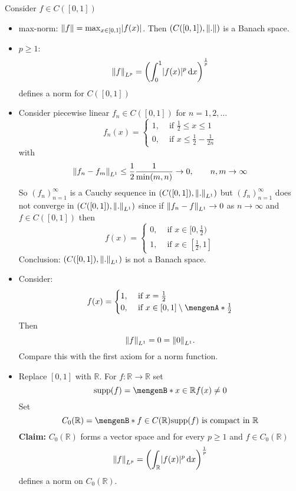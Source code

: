 Consider $ f \in C([0,1])$
\begin{itemize}
	\item max-norm: $\norm{f} = \max_{x \in [0,1]}\abs{f(x)}$. Then $(C([0,1]),\norm{.})$ is a Banach space.
	\item $p \geq 1:$
	\[
		\norm{f}_{L^p} = \left( \int_{0}^{1}\abs{f(x)}^p \,\mathrm{d}x \right)^{\frac{1}{p}} 
	\]
	defines a norm for $C([0,1])$
\end{itemize}
\begin{bemerkung}
	\begin{itemize}
		\item Consider piecewise linear $f_n \in C([0,1])$ for $n =1,2, \dots$
		\[
			f_n(x) = \begin{cases}
				1, &\text{ if } \frac{1}{2} \leq x \leq 1 \\
				0, &\text{ if } x \leq \frac{1}{2} - \frac{1}{2n}
			\end{cases}
		\]
		with
		\[
			\norm{f_n-f_m}_{L^1} \leq \frac{1}{2} \frac{1}{\min(m,n)} \to 0, \qquad n,m \to \infty
		\]
		So $(f_n)_{n=1}^{\infty}$ is a Cauchy sequence in $(C([0,1]),\norm{.}_{L^1})$ but $(f_n)_{n=1}^{\infty}$ does not converge in $(C([0,1]),\norm{.}_{L^1})$ since
		if $\norm{f_n - f}_{L^1} \to 0$ as $n \to \infty$ and $f \in C([0,1])$ then
		\[
			f(x) = \begin{cases}
				0, &\text{ if }x \in [0,\frac{1}{2})\\
				1, &\text{ if }x \in [\frac{1}{2},1]
			\end{cases}
		\]
		Conclusion: $(C([0,1]), \norm{.}_{L^1})$ is not a Banach space.
		\item Consider:
		\[
			f(x) = \begin{cases}
				1, &\text{ if }x = \frac{1}{2}\\
				0, &\text{ if }x \in [0,1] \setminus \set{\frac{1}{2}}
			\end{cases}
		\]
		Then
		\[
			\norm{f}_{L^1} = 0 = \norm{0}_{L^1}.
		\]
		Compare this with the first axiom for a norm function.
		\item Replace $[0,1]$ with $\mathbb{R}$. For $f : \mathbb{R} \to \mathbb{R}$ set \[
			\supp(f) = \set[x \in \mathbb{R}]{f(x) \neq 0}
		\]
		Set 
		\[
			C_0(\mathbb{R}) = \set[f \in C(\mathbb{R})]{ \supp(f) \text{ is compact in }\mathbb{R}}
		\]
		\textbf{Claim:} \text{    }      $C_0(\mathbb{R})$ forms a vector space and for every $p \geq 1$ and $f \in C_0(\mathbb{R})$
		\[
			\norm{f}_{L^p} = \left( \int_{\mathbb{R}}^{} \abs{f(x)}^p \,\mathrm{d}x \right)^{\frac{1}{p}}
		\] defines a norm on $C_0(\mathbb{R})$. \\

\end{itemize}
\end{bemerkung}
